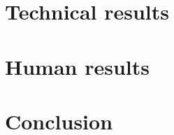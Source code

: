 \documentclass{book}
\begin{document}
	\section{Technical results}
	\section{Human results} 
	\section{Conclusion} 

\newpage

\printglossaries\label{glossary}







\pagestyle{empty}
\newpage

\ifthenelse{\isodd{\value{page}}}
{}%
{\hbox{}\clearpage}%


\end{document}
